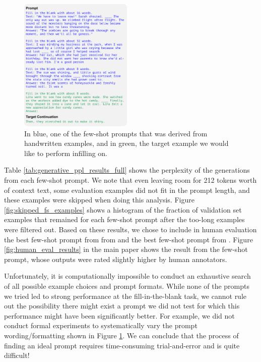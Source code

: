\begin{figure}
    \centering
    \includegraphics[width=0.48\textwidth]{figures/fsprompt}
    \caption{In blue, one of the few-shot prompts that was derived from handwritten examples, and in green, the target example we would like to perform infilling on.}
    \label{fig:few_shot_prompt}
\end{figure}

Table \ref{tab:generative_ppl_results_full} shows the perplexity of the generations from each few-shot prompt.
We note that even leaving room for 212 tokens worth of context text, some evaluation examples did not fit in the prompt length, and these examples were skipped when doing this analysis.
Figure \ref{fig:skipped_fs_examples} shows a histogram of the fraction of validation set examples that remained for each few-shot prompt after the too-long examples were filtered out.
Based on these results, we chose to include in human evaluation the best few-shot prompt from from \rocFITB and the best few-shot prompt from \cFITB.
Figure \ref{fig:human_eval_results} in the main paper shows the result from the \cFITB few-shot prompt, whose outputs were rated slightly higher by human annotators.

Unfortunately, it is computationally impossible to conduct an exhaustive search of all possible example choices and prompt formats. 
While none of the prompts we tried led to strong performance at the fill-in-the-blank task, we cannot rule out the possibility there might exist a prompt we did not test for which this performance might have been significantly better.
For example, we did not conduct formal experiments to systematically vary the prompt wording/formatting shown in Figure \ref{fig:few_shot_prompt}.
We can conclude that the process of finding an ideal prompt requires time-consuming trial-and-error and is quite difficult!

